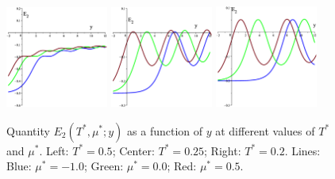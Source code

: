 \documentclass[12pt]{article}
\numberwithin{equation}{section}
\begin{document}
	\begin{figure}[htbp]
		\includegraphics[width=0.3\textwidth,angle=0]{images/E2y_vs_y_a1}
		\hfill
		\includegraphics[width=0.3\textwidth,angle=0]{images/E2y_vs_y_a2}
		\hfill
		\includegraphics[width=0.3\textwidth,angle=0]{images/E2y_vs_y_a3}
		\\
		\vfill
		\parbox{0.95\textwidth}{\caption{\label{fig:E2y_vs_y_a} Quantity $E_2(T^*,\mu^*;y)$ as a function of $y$ at different values of $T^*$ and $\mu^*$. Left: $T^*=0.5$; Center: $T^*=0.25$; Right: $T^*=0.2$. Lines: Blue: $\mu^*=-1.0$; Green: $\mu^*=0.0$; Red: $\mu^*=0.5$.}}
		
	\end{figure}
	
\end{document}
